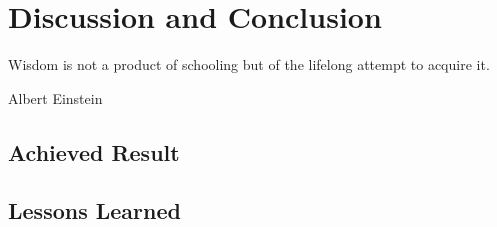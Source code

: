\chapter{Discussion and Conclusion}
\epigraph{Wisdom is not a product of schooling but of the lifelong attempt to acquire it.}{Albert Einstein}
\section{Achieved Result}




\section{Lessons Learned}

